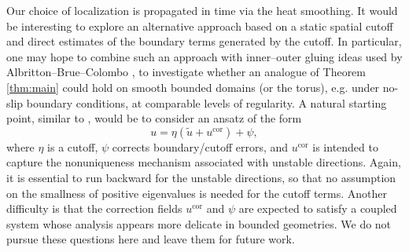 \documentclass[11pt,a4paper]{article}
\numberwithin{equation}{section}
\begin{document}
\begin{remark}\label{rmk4}
    {Our choice of localization is propagated in time via the heat smoothing. It would be interesting to explore an alternative approach based on a static spatial cutoff and direct estimates of the boundary terms generated by the cutoff. In particular, one may hope to combine such an approach with inner–outer gluing ideas used by Albritton--Brue--Colombo \cite{albritton2023gluing}, to investigate whether an analogue of Theorem \ref{thm:main} could hold on smooth bounded domains (or the torus), e.g. under no-slip boundary conditions, at comparable levels of regularity. %
    A natural starting point, similar to \cite{albritton2023gluing}, would be to consider an ansatz of the form
\[
u = \eta(\tilde u + u^{\mathrm{cor}}) + \psi,
\]
where \(\eta\) is a cutoff, \(\psi\) corrects boundary/cutoff errors, and \(u^{\mathrm{cor}}\) is intended to capture the nonuniqueness mechanism associated with unstable directions. Again, it is essential to run backward for the unstable directions, so that no assumption on the smallness of positive eigenvalues is needed for the cutoff terms. Another difficulty is that the correction fields $u^{\mathrm{cor}}$ and $\psi$ are expected to satisfy a coupled system whose analysis appears more delicate in bounded geometries. We do not pursue these questions here and leave them for future work.%
}
\end{remark}
\end{document}
